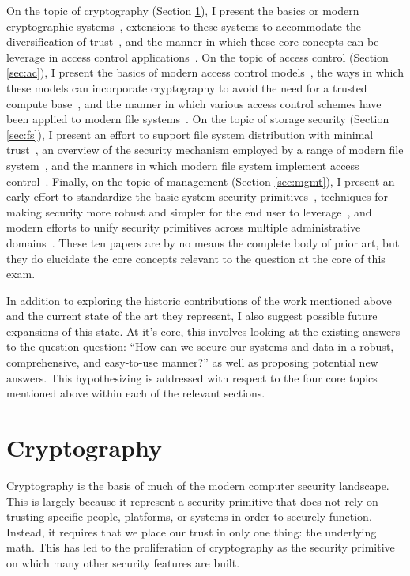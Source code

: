 \documentclass{sig-alternate}
\begin{document}
On the topic of cryptography (Section \ref{sec:crypto}), I present the
basics or modern cryptographic systems~\cite{Diffie1976}, extensions
to these systems to accommodate the diversification of
trust~\cite{Shamir1979}, and the manner in which these core concepts
can be leverage in access control
applications~\cite{Bethencourt2007}. On the topic of access control
(Section \ref{sec:ac}), I present the basics of modern access control
models~\cite{Sandhu1996}, the ways in which these models can
incorporate cryptography to avoid the need for a trusted compute
base~\cite{Bethencourt2007}, and the manner in which various access
control schemes have been applied to modern file
systems~\cite{Miltchev2008}. On the topic of storage security (Section
\ref{sec:fs}), I present an effort to support file system distribution
with minimal trust~\cite{Mazieres1999}, an overview of the security
mechanism employed by a range of modern file system~\cite{Kher2005},
and the manners in which modern file system implement access
control~\cite{Miltchev2008}. Finally, on the topic of management
(Section \ref{sec:mgmt}), I present an early effort to standardize the
basic system security primitives~\cite{Samar1996}, techniques for
making security more robust and simpler for the end user to
leverage~\cite{Cox2002}, and modern efforts to unify security
primitives across multiple administrative
domains~\cite{Morgan2004}. These ten papers are by no means the
complete body of prior art, but they do elucidate the core concepts
relevant to the question at the core of this exam.

In addition to exploring the historic contributions of the work
mentioned above and the current state of the art they represent, I
also suggest possible future expansions of this state. At it's core,
this involves looking at the existing answers to the question
question: ``How can we secure our systems and data in a robust,
comprehensive, and easy-to-use manner?'' as well as proposing
potential new answers. This hypothesizing is addressed with respect to
the four core topics mentioned above within each of the relevant
sections.

\section{Cryptography}
\label{sec:crypto}

Cryptography is the basis of much of the modern computer security
landscape. This is largely because it represent a security primitive
that does not rely on trusting specific people, platforms, or systems
in order to securely function. Instead, it requires that we place our
trust in only one thing: the underlying math. This has led to the
proliferation of cryptography as the security primitive on which many
other security features are built.
\end{document}

